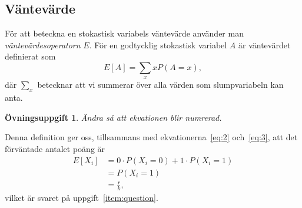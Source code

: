 \documentclass[12pt,a4wide]{article}
\theoremstyle{uppgiftsstil}
\newcommand{\ovningstext}{Övningsuppgift}
\newtheorem{ovning}{\ovningstext}
\newenvironment{uppgift}{\begin{framed}\begin{ovning}}%
                        {\end{ovning}\end{framed}}
\theoremstyle{avklaradstil}
\begin{document}
\subsection{Väntevärde}

För att beteckna en stokastisk variabels väntevärde använder man
\emph{vänte\-värdes\-operatorn} $E$. 
För en godtycklig stokastisk variabel $A$ är väntevärdet definierat
som 
\begin{equation*}             %
  E[ A ] = \sum_x xP(A = x),  %
\end{equation*}
där $\sum_x$ betecknar att vi summerar över alla värden som
slumpvariabeln kan anta. 

\begin{uppgift}
  Ändra så att ekvationen blir numrerad.
\end{uppgift}

Denna definition ger oss, tillsammans med ekvationerna~\ref{eq:2}
och~\ref{eq:3},   
att det förväntade antalet poäng är 
\begin{align} %
  E[X_i] &= 0\cdot P(X_i=0)+1\cdot P(X_i=1) \nonumber \\ %
         &= P(X_i=1) \nonumber \\                        %
         &= \boxed{\frac{r}{k}}, \label{eq:oneq}         %
\end{align}
vilket är svaret på uppgift~\ref{item:question}. 
\end{document}
